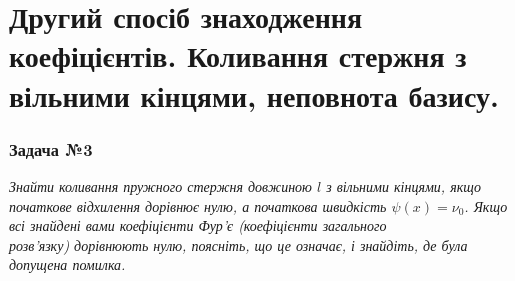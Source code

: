 \documentclass[a4paper, 14pt]{extreport}
\begin{document}
\section{Другий спосіб знаходження коефіцієнтів. Коливання стержня з вільними кінцями, неповнота базису.}

\subsubsection{Задача №3}

\textit{Знайти коливання пружного стержня довжиною $l$ з вільними кінцями, якщо початкове відхилення дорівнює нулю, а початкова швидкість $\psi(x) = \nu_0$. Якщо всі знайдені вами коефіцієнти Фур'є (коефіцієнти загального\\ розв’язку) дорівнюють нулю, поясніть, що це означає, і знайдіть, де була допущена помилка.}
\end{document}
